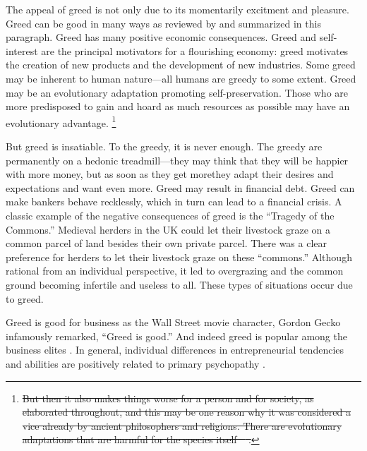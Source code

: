 \documentclass[10pt, letterpaper]{article}
\providecommand{\DIFaddtex}[1]{{\protect\color{blue}\uwave{#1}}} %
\providecommand{\DIFdeltex}[1]{{\protect\color{red}\sout{#1}}}                      %
\providecommand{\DIFaddbegin}{} %
\providecommand{\DIFaddend}{} %
\providecommand{\DIFdelbegin}{} %
\providecommand{\DIFdelend}{} %
\providecommand{\DIFadd}[1]{\texorpdfstring{\DIFaddtex{#1}}{#1}} %
\providecommand{\DIFdel}[1]{\texorpdfstring{\DIFdeltex{#1}}{}} %
\newcommand{\DIFscaledelfig}{0.5}
\newlength{\DIFdelgraphicswidth} %
\newlength{\DIFdelgraphicsheight} %
\newcommand{\DIFaddincludegraphics}[2][]{{\color{blue}\fbox{\DIFOincludegraphics[#1]{#2}}}} %
\newcommand{\DIFdelincludegraphics}[2][]{%
\sbox{\DIFdelgraphicsbox}{\DIFOincludegraphics[#1]{#2}}%
\settoboxwidth{\DIFdelgraphicswidth}{\DIFdelgraphicsbox} %
\settoboxtotalheight{\DIFdelgraphicsheight}{\DIFdelgraphicsbox} %
\scalebox{\DIFscaledelfig}{%
\parbox[b]{\DIFdelgraphicswidth}{\usebox{\DIFdelgraphicsbox}\\[-\baselineskip] \rule{\DIFdelgraphicswidth}{0em}}\llap{\resizebox{\DIFdelgraphicswidth}{\DIFdelgraphicsheight}{%
\setlength{\unitlength}{\DIFdelgraphicswidth}%
\begin{picture}(1,1)%
\thicklines\linethickness{2pt} %
{\color[rgb]{1,0,0}\put(0,0){\framebox(1,1){}}}%
{\color[rgb]{1,0,0}\put(0,0){\line( 1,1){1}}}%
{\color[rgb]{1,0,0}\put(0,1){\line(1,-1){1}}}%
\end{picture}%
}\hspace*{3pt}}} %
} %
\DeclareRobustCommand{\DIFaddbegin}{\DIFOaddbegin \let\includegraphics\DIFaddincludegraphics} %
\DeclareRobustCommand{\DIFaddend}{\DIFOaddend \let\includegraphics\DIFOincludegraphics} %
\DeclareRobustCommand{\DIFdelbegin}{\DIFOdelbegin \let\includegraphics\DIFdelincludegraphics} %
\DeclareRobustCommand{\DIFdelend}{\DIFOaddend \let\includegraphics\DIFOincludegraphics} %
\begin{document}
\begin{spacing}{1.8}
The appeal of greed is not only due to its momentarily excitment and pleasure. 
Greed can be good in many ways as reviewed by \citet{seuntjens15b} and
summarized in this paragraph. Greed has many positive economic consequences. Greed and self-interest are the principal motivators for a flourishing economy: greed motivates the creation of new
products and the development of new industries. 
Some greed may be inherent to human nature---all humans are greedy to some extent. %
Greed may be an evolutionary adaptation promoting self-preservation. Those who are more predisposed to gain and hoard as much resources as possible may have an
evolutionary advantage. \DIFdelbegin \footnote{\DIFdel{But then it also makes things worse for a person and for society, as elaborated throughout, and this may be one reason why
it was considered a vice already by ancient philosophers and religions. There are evolutionary adaptations that are harmful for the species itself \mbox{%
\citep{frank12}}\hspace{0pt}%
.}}
\addtocounter{footnote}{-1}%
\DIFdelend %
%
 But greed is insatiable. To the greedy, it is never enough. The greedy are permanently on a hedonic treadmill---they may think that they will be happier
with more money, but as soon as they get more\DIFaddbegin \DIFadd{, }\DIFaddend they adapt their desires and expectations and want even more.
%
Greed may result in financial debt. Greed can make  bankers behave recklessly, which in turn can lead to a financial crisis. A classic example of the
negative consequences of greed is the ``Tragedy of the Commons.'' Medieval herders in the UK could let their livestock graze on a common parcel of land besides their own private parcel. There was a clear preference
for herders to let their livestock graze on these ``commons.'' Although rational from an
individual perspective, it led to overgrazing and the common ground becoming infertile and useless to all.  These types of situations occur due to greed.



Greed is good for business as the Wall Street movie
 character, Gordon Gecko infamously remarked, ``Greed is good.'' And indeed greed is popular among the business elites \citep{robinson2009greed}.
In general, individual differences in entrepreneurial tendencies
and abilities are positively related to primary psychopathy \citep{akhtar2013greed} %
 \citep{feherrelationship}.


\end{spacing}
\end{document}
